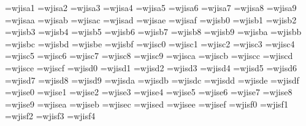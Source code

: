 % 
\font\jfaB=wjisa1
\font\jfaC=wjisa2
\font\jfaD=wjisa3
\font\jfaE=wjisa4
\font\jfaF=wjisa5
\font\jfaG=wjisa6
\font\jfaH=wjisa7
\font\jfaI=wjisa8
\font\jfaJ=wjisa9
\font\jfaa=wjisaa
\font\jfab=wjisab
\font\jfac=wjisac
\font\jfad=wjisad
\font\jfae=wjisae
\font\jfaf=wjisaf
\font\jfbA=wjisb0
\font\jfbB=wjisb1
\font\jfbC=wjisb2
\font\jfbD=wjisb3
\font\jfbE=wjisb4
\font\jfbF=wjisb5
\font\jfbG=wjisb6
\font\jfbH=wjisb7
\font\jfbI=wjisb8
\font\jfbJ=wjisb9
\font\jfba=wjisba
\font\jfbb=wjisbb
\font\jfbc=wjisbc
\font\jfbd=wjisbd
\font\jfbe=wjisbe
\font\jfbf=wjisbf
\font\jfcA=wjisc0
\font\jfcB=wjisc1
\font\jfcC=wjisc2
\font\jfcD=wjisc3
\font\jfcE=wjisc4
\font\jfcF=wjisc5
\font\jfcG=wjisc6
\font\jfcH=wjisc7
\font\jfcI=wjisc8
\font\jfcJ=wjisc9
\font\jfca=wjisca
\font\jfcb=wjiscb
\font\jfcc=wjiscc
\font\jfcd=wjiscd
\font\jfce=wjisce
\font\jfcf=wjiscf
\font\jfdA=wjisd0
\font\jfdB=wjisd1
\font\jfdC=wjisd2
\font\jfdD=wjisd3
\font\jfdE=wjisd4
\font\jfdF=wjisd5
\font\jfdG=wjisd6
\font\jfdH=wjisd7
\font\jfdI=wjisd8
\font\jfdJ=wjisd9
\font\jfda=wjisda
\font\jfdb=wjisdb
\font\jfdc=wjisdc
\font\jfdd=wjisdd
\font\jfde=wjisde
\font\jfdf=wjisdf
\font\jfeA=wjise0
\font\jfeB=wjise1
\font\jfeC=wjise2
\font\jfeD=wjise3
\font\jfeE=wjise4
\font\jfeF=wjise5
\font\jfeG=wjise6
\font\jfeH=wjise7
\font\jfeI=wjise8
\font\jfeJ=wjise9
\font\jfea=wjisea
\font\jfeb=wjiseb
\font\jfec=wjisec
\font\jfed=wjised
\font\jfee=wjisee
\font\jfef=wjisef
\font\jffA=wjisf0
\font\jffB=wjisf1
\font\jffC=wjisf2
\font\jffD=wjisf3
\font\jffE=wjisf4
%
\newif\ifjisfontset
\jisfontsetfalse %
\newif\ifbigJ
\bigJfalse %
\def\jglue{\hskip0pt plus.5pt}
\newcount\Jchar
%
\def\jchar#1{\Jchar=#1\ifbigJ\advance\Jchar by -128\fi\char\the\Jchar}
\def\jischar#1#2{\ifjisfontset\jchar{#1}\restorefont\discretionary{}{}{}\jglue\jisfontsetfalse\else\jisfontsettrue\edef\restorefont{\the\font}#2\fi}
\def\jischr#1{\ifjisfontset\jchar{#1}\restorefont\jisfontsetfalse\else\message{!pmJ! character #1 out of context!}\fi}
